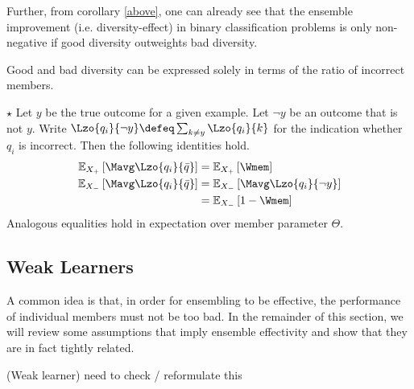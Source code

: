 \documentclass[../main.tex]{subfiles}
\begin{document}
Further, from corollary \ref{above}, one can already see that the ensemble improvement (i.e. diversity-effect) in binary classification problems is only non-negative if good diversity outweights bad diversity.


Good and bad diversity can be expressed solely in terms of the ratio of incorrect members. 
\begin{lemma} $\star$ Let $y$ be the true outcome for a given example. Let $\neg y$ be an outcome that is not $y$. Write $\Lzo{q_i}{\neg y} \defeq \sum_{k \not= y} \Lzo{q_i}{k}$ for the indication whether $q_i$ is incorrect. Then the following identities hold.
\begin{align*}
\mathbb{E}_{X_{+}}\left[ \Mavg \Lzo{q_{i}}{\bar{q}} \right] &=
\mathbb{E}_{X_{+}}\left[ \Wmem \right]   \\
\mathbb{E}_{X_{-}}\left[ \Mavg \Lzo{q_{i}}{\bar{q}} \right]  &= \mathbb{E}_{X_{-}}\left[ \Mavg  \Lzo{q_{i}}{\neg y} \right]  \\
&=
\mathbb{E}_{X_{-}}\left[ 1 - \Wmem \right]
\end{align*}
Analogous equalities hold in expectation over member parameter $\Theta$.
\end{lemma}

\subsection{Weak Learners}

A common idea is that, in order for ensembling to be effective, the performance of individual members must not be too bad. In the remainder of this section, we will review some assumptions that imply ensemble effectivity and show that they are in fact tightly related.

\begin{definition} 
   \label{def:weak-learner}  (Weak learner)
    need to check / reformulate this
\end{definition}
\end{document}
